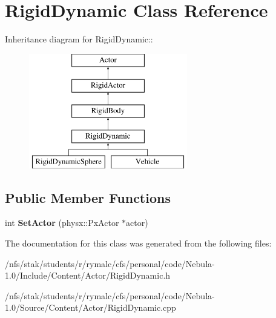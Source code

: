 \hypertarget{classRigidDynamic}{
\section{RigidDynamic Class Reference}
\label{classRigidDynamic}
}
Inheritance diagram for RigidDynamic::\begin{figure}[H]
\begin{center}
\leavevmode
\includegraphics[height=5cm]{classRigidDynamic}
\end{center}
\end{figure}
\subsection*{Public Member Functions}
\begin{DoxyCompactItemize}
\item 
\hypertarget{classRigidDynamic_a389d4e9d32e5405418d9c46925e5cdd0}{
int {\bfseries SetActor} (physx::PxActor $\ast$actor)}
\label{classRigidDynamic_a389d4e9d32e5405418d9c46925e5cdd0}

\end{DoxyCompactItemize}


The documentation for this class was generated from the following files:\begin{DoxyCompactItemize}
\item 
/nfs/stak/students/r/rymalc/cfs/personal/code/Nebula-\/1.0/Include/Content/Actor/RigidDynamic.h\item 
/nfs/stak/students/r/rymalc/cfs/personal/code/Nebula-\/1.0/Source/Content/Actor/RigidDynamic.cpp\end{DoxyCompactItemize}
